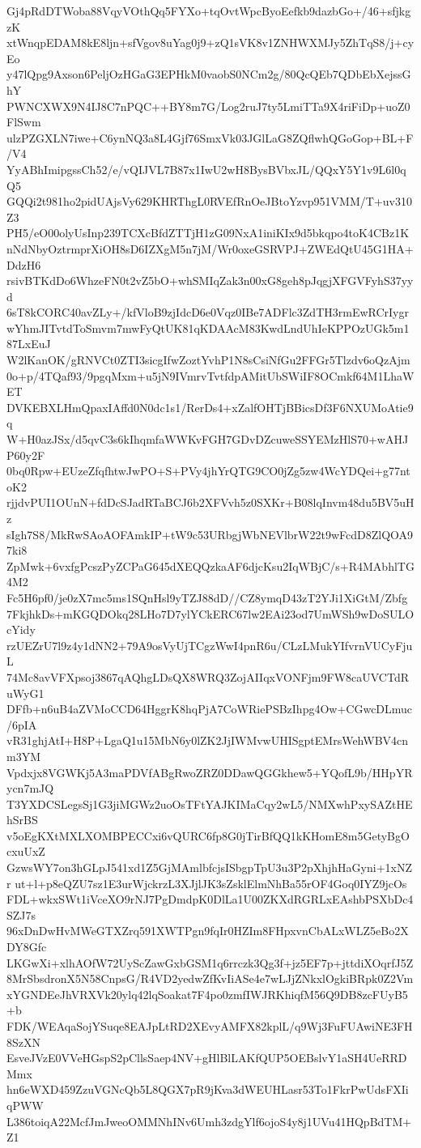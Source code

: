 Gj4pRdDTWoba88VqyVOthQq5FYXo+tqOvtWpcByoEefkb9dazbGo+/46+sfjkgzK
xtWnqpEDAM8kE8ljn+sfVgov8uYag0j9+zQ1sVK8v1ZNHWXMJy5ZhTqS8/j+cyEo
y47lQpg9Axson6PeljOzHGaG3EPHkM0vaobS0NCm2g/80QcQEb7QDbEbXejssGhY
PWNCXWX9N4IJ8C7nPQC++BY8m7G/Log2ruJ7ty5LmiTTa9X4riFiDp+uoZ0FlSwm
ulzPZGXLN7iwe+C6ynNQ3a8L4Gjf76SmxVk03JGlLaG8ZQflwhQGoGop+BL+F/V4
YyABhImipgssCh52/e/vQIJVL7B87x1IwU2wH8BysBVbxJL/QQxY5Y1v9L6l0qQ5
GQQi2t981ho2pidUAjsVy629KHRThgL0RVEfRnOeJBtoYzvp951VMM/T+uv310Z3
PH5/eO00olyUsInp239TCXcBfdZTTjH1zG09NxA1iniKIx9d5bkqpo4toK4CBz1K
nNdNbyOztrmprXiOH8sD6IZXgM5n7jM/Wr0oxeGSRVPJ+ZWEdQtU45G1HA+DdzH6
rsivBTKdDo6WhzeFN0t2vZ5bO+whSMIqZak3n00xG8geh8pJqgjXFGVFyhS37yyd
6sT8kCORC40avZLy+/kfVloB9zjIdcD6e0Vqz0IBe7ADFlc3ZdTH3rmEwRCrIygr
wYhmJITvtdToSmvm7mwFyQtUK81qKDAAcM83KwdLndUhIeKPPOzUGk5m187LxEuJ
W2lKanOK/gRNVCt0ZTI3sicgIfwZoztYvhP1N8sCsiNfGu2FFGr5Tlzdv6oQzAjm
0o+p/4TQaf93/9pgqMxm+u5jN9IVmrvTvtfdpAMitUbSWiIF8OCmkf64M1LhaWET
DVKEBXLHmQpaxIAffd0N0dc1s1/RerDs4+xZalfOHTjBBicsDf3F6NXUMoAtie9q
W+H0azJSx/d5qvC3s6kIhqmfaWWKvFGH7GDvDZcuweSSYEMzHlS70+wAHJP60y2F
0bq0Rpw+EUzeZfqfhtwJwPO+S+PVy4jhYrQTG9CO0jZg5zw4WcYDQei+g77ntoK2
rjjdvPUI1OUnN+fdDcSJadRTaBCJ6b2XFVvh5z0SXKr+B08lqInvm48du5BV5uHz
sIgh7S8/MkRwSAoAOFAmkIP+tW9c53URbgjWbNEVlbrW22t9wFcdD8ZlQOA97ki8
ZpMwk+6vxfgPcszPyZCPaG645dXEQQzkaAF6djcKsu2IqWBjC/s+R4MAbhlTG4M2
Fc5H6pf0/je0zX7mc5ms1SQnHsl9yTZJ88dD//CZ8ymqD43zT2YJi1XiGtM/Zbfg
7FkjhkDs+mKGQDOkq28LHo7D7ylYCkERC67lw2EAi23od7UmWSh9wDoSULOcYidy
rzUEZrU7l9z4y1dNN2+79A9osVyUjTCgzWwI4pnR6u/CLzLMukYIfvrnVUCyFjuL
74Mc8avVFXpsoj3867qAQhgLDsQX8WRQ3ZojAIIqxVONFjm9FW8caUVCTdRuWyG1
DFfb+n6uB4aZVMoCCD64HggrK8hqPjA7CoWRiePSBzIhpg4Ow+CGwcDLmuc/6pIA
vR31ghjAtI+H8P+LgaQ1u15MbN6y0lZK2JjIWMvwUHISgptEMrsWehWBV4cnm3YM
Vpdxjx8VGWKj5A3maPDVfABgRwoZRZ0DDawQGGkhew5+YQofL9b/HHpYRycn7mJQ
T3YXDCSLegsSj1G3jiMGWz2uoOsTFtYAJKIMaCqy2wL5/NMXwhPxySAZtHEhSrBS
v5oEgKXtMXLXOMBPECCxi6vQURC6fp8G0jTirBfQQ1kKHomE8m5GetyBgOcxuUxZ
GzwsWY7on3hGLpJ541xd1Z5GjMAmlbfcjsISbgpTpU3u3P2pXhjhHaGyni+1xNZr
ut+l+p8eQZU7sz1E3urWjckrzL3XJjlJK3sZsklElmNhBa55rOF4Goq0IYZ9jcOs
FDL+wkxSWt1iVceXO9rNJ7PgDmdpK0DlLa1U00ZKXdRGRLxEAshbPSXbDc4SZJ7s
96xDnDwHvMWeGTXZrq591XWTPgn9fqIr0HZIm8FHpxvnCbALxWLZ5eBo2XDY8Gfc
LKGwXi+xlhAOfW72UyScZawGxbGSM1q6rrczk3Qg3f+jz5EF7p+jttdiXOqrfJ5Z
8MrSbsdronX5N58CnpsG/R4VD2yedwZfKvIiASe4e7wLJjZNkxlOgkiBRpk0Z2Vm
xYGNDEeJhVRXVk20ylq42lqSoakat7F4po0zmfIWJRKhiqfM56Q9DB8zcFUyB5+b
FDK/WEAqaSojYSuqe8EAJpLtRD2XEvyAMFX82kplL/q9Wj3FuFUAwiNE3FH8SzXN
EsveJVzE0VVeHGspS2pCllsSaep4NV+gHlBlLAKfQUP5OEBslvY1aSH4UeRRDMmx
hn6eWXD459ZzuVGNcQb5L8QGX7pR9jKva3dWEUHLasr53To1FkrPwUdsFXIiqPWW
L386toiqA22McfJmJweoOMMNhINv6Umh3zdgYlf6ojoS4y8j1UVu41HQpBdTM+Z1
